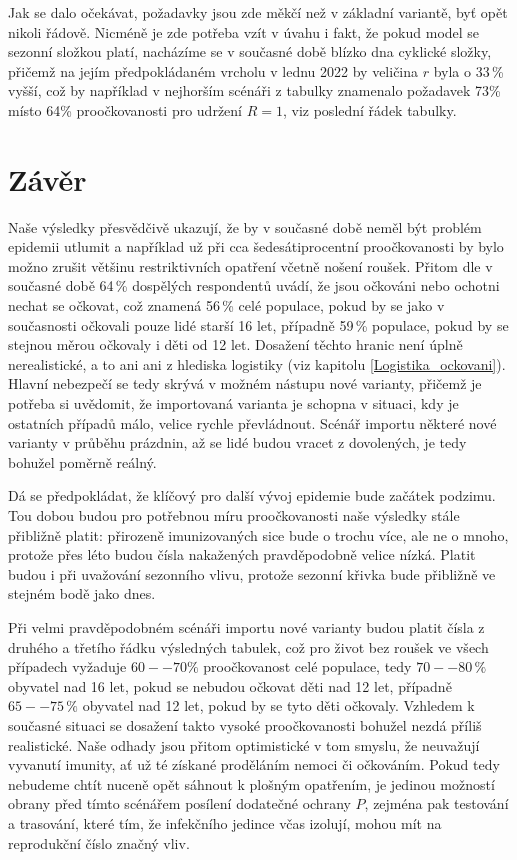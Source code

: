 Jak se dalo očekávat, požadavky jsou zde měkčí než v základní variantě,
byť opět nikoli řádově. Nicméně je zde potřeba vzít v úvahu i fakt, že  pokud model se sezonní složkou platí, nacházíme se v současné době blízko dna cyklické složky, přičemž na jejím předpokládaném
vrcholu v lednu 2022 by veličina $r$ byla o 33\,\% vyšší, což by například
v nejhorším scénáři z tabulky znamenalo požadavek 73\% místo 64\% proočkovanosti
pro udržení $R=1$, viz poslední řádek tabulky.

\section*{Závěr}

Naše výsledky přesvědčivě ukazují, že by v současné době neměl být problém epidemii
utlumit a například už při cca šedesátiprocentní proočkovanosti
by bylo možno zrušit většinu restriktivních opatření včetně nošení roušek. Přitom dle \cite{paqcovid} v současné době 64\,\% dospělých respondentů uvádí, že jsou očkováni nebo ochotni nechat se očkovat, což znamená 56\,\% celé populace, pokud by se jako v současnosti očkovali pouze lidé starší 16 let, případně 59\,\% populace, pokud by se stejnou měrou očkovaly i děti od 12 let. Dosažení těchto hranic není úplně nerealistické, a to ani
ani z hlediska logistiky (viz kapitolu \ref{Logistika_ockovani}). Hlavní nebezpečí se tedy
skrývá v možném nástupu nové varianty, přičemž je potřeba si uvědomit,
že importovaná varianta je schopna v situaci, kdy je ostatních
případů málo, velice rychle převládnout. Scénář importu některé
nové varianty v průběhu prázdnin, až se lidé budou vracet z dovolených, je
tedy bohužel poměrně reálný.

Dá se předpokládat, že klíčový pro další vývoj epidemie bude začátek podzimu. Tou dobou budou pro potřebnou míru proočkovanosti naše výsledky stále přibližně platit: přirozeně imunizovaných sice bude o trochu více, ale ne o mnoho, protože přes léto budou čísla nakažených pravděpodobně velice nízká. Platit budou i při uvažování sezonního vlivu, protože sezonní křivka bude přibližně ve stejném bodě jako dnes. 

Při velmi pravděpodobném scénáři importu nové varianty budou platit čísla z druhého a třetího řádku výsledných tabulek, což pro život bez roušek ve všech případech vyžaduje $60--70\%$ proočkovanost celé populace, tedy $70--80\,\%$ obyvatel nad 16 let, pokud se nebudou očkovat děti nad 12 let, případně $65--75\,\%$ obyvatel nad 12 let, pokud by se tyto děti očkovaly. Vzhledem k současné situaci se dosažení takto vysoké proočkovanosti bohužel nezdá příliš realistické. Naše odhady jsou přitom optimistické v tom smyslu, že neuvažují vyvanutí imunity, ať už té získané proděláním nemoci či očkováním.
Pokud tedy nebudeme chtít nuceně opět sáhnout k plošným
opatřením, je jedinou možností obrany před tímto scénářem posílení
dodatečné ochrany $P$, zejména pak testování a trasování, které tím, že
infekčního jedince včas izolují, mohou mít na reprodukční číslo značný
vliv.